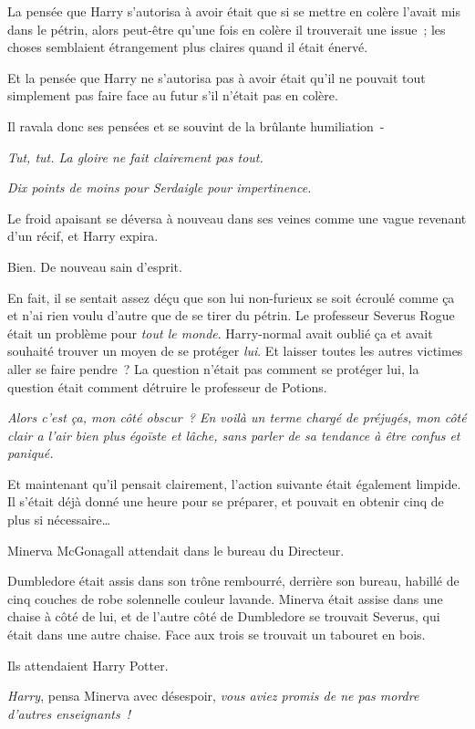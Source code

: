 La pensée que Harry s'autorisa à avoir était que si se mettre en colère l'avait mis dans le pétrin, alors peut-être qu'une fois en colère il trouverait une issue~; les choses semblaient étrangement plus claires quand il était énervé.

Et la pensée que Harry ne s'autorisa pas à avoir était qu'il ne pouvait tout simplement pas faire face au futur s'il n'était pas en colère.

Il ravala donc ses pensées et se souvint de la brûlante humiliation~-

\emph{Tut, tut. La gloire ne fait clairement pas tout.}

\emph{Dix points de moins pour Serdaigle pour impertinence.}

Le froid apaisant se déversa à nouveau dans ses veines comme une vague revenant d'un récif, et Harry expira.

Bien. De nouveau sain d'esprit.

En fait, il se sentait assez déçu que son lui non-furieux se soit écroulé comme ça et n'ai rien voulu d'autre que de se tirer du pétrin. Le professeur Severus Rogue était un problème pour \emph{tout le monde}. Harry-normal avait oublié ça et avait souhaité trouver un moyen de se protéger \emph{lui}. Et laisser toutes les autres victimes aller se faire pendre~? La question n'était pas comment se protéger lui, la question était comment détruire le professeur de Potions.

\emph{Alors c'est ça, mon côté obscur~? En voilà un terme chargé de préjugés, mon côté clair a l'air bien plus égoïste et lâche, sans parler de sa tendance à être confus et paniqué.}

Et maintenant qu'il pensait clairement, l'action suivante était également limpide. Il s'était déjà donné une heure pour se préparer, et pouvait en obtenir cinq de plus si nécessaire…

\later

Minerva McGonagall attendait dans le bureau du Directeur.

Dumbledore était assis dans son trône rembourré, derrière son bureau, habillé de cinq couches de robe solennelle couleur lavande. Minerva était assise dans une chaise à côté de lui, et de l'autre côté de Dumbledore se trouvait Severus, qui était dans une autre chaise. Face aux trois se trouvait un tabouret en bois.

Ils attendaient Harry Potter.

\emph{Harry}, pensa Minerva avec désespoir, \emph{vous aviez promis de ne pas mordre d'autres enseignants~!}

